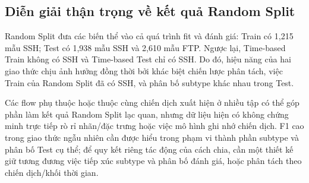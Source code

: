 \subsection{Diễn giải thận trọng về kết quả Random Split}
Random Split đưa các biến thể vào cả quá trình fit và đánh giá: Train có 1,215 mẫu SSH; Test có 1,938 mẫu SSH và 2,610 mẫu FTP. Ngược lại, Time-based Train không có SSH và Time-based Test chỉ có SSH. Do đó, hiệu năng của hai giao thức chịu ảnh hưởng đồng thời bởi khác biệt chiến lược phân tách, việc Train của Random Split đã có SSH, và phân bố subtype khác nhau trong Test.

Các flow phụ thuộc hoặc thuộc cùng chiến dịch xuất hiện ở nhiều tập có thể góp phần làm kết quả Random Split lạc quan, nhưng dữ liệu hiện có không chứng minh trực tiếp rò rỉ nhãn/đặc trưng hoặc việc mô hình ghi nhớ chiến dịch. F1 cao trong giao thức ngẫu nhiên cần được hiểu trong phạm vi thành phần subtype và phân bố Test cụ thể; để quy kết riêng tác động của cách chia, cần một thiết kế giữ tương đương việc tiếp xúc subtype và phân bố đánh giá, hoặc phân tách theo chiến dịch/khối thời gian.
